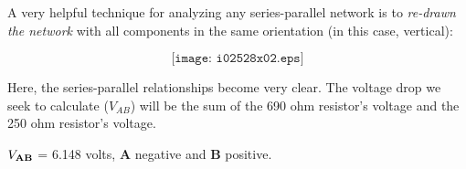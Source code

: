 
A very helpful technique for analyzing any series-parallel network is to {\it re-drawn the network} with all components in the same orientation (in this case, vertical):

$$\texttt{[image: i02528x02.eps]}$$

Here, the series-parallel relationships become very clear.  The voltage drop we seek to calculate ($V_{AB}$) will be the sum of the 690 ohm resistor's voltage and the 250 ohm resistor's voltage.

\vskip 10pt

$V_{\bf AB}$ = 6.148 volts, {\bf A} negative and {\bf B} positive.




